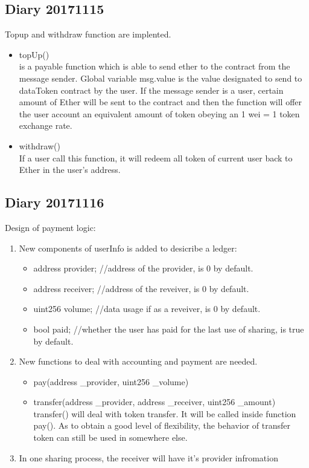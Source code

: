 \subsection{Diary 20171115}
Topup and withdraw function are implented.\\
\begin{itemize}
    \item topUp()\\
    is a payable function which is able to send ether to the contract from the message sender.
    Global variable msg.value is the value designated to send to dataToken contract by the user.
    If the message sender is a user, certain amount of Ether will be sent to the contract and then 
    the function will offer the user account an equivalent amount of token
    obeying an 1 wei = 1 token exchange rate.\\
    \item withdraw()\\
    If a user call this function, 
    it will redeem all token of current user back to Ether in the user's address.
\end{itemize}

\subsection{Diary 20171116}
Design of payment logic:\\
\begin{enumerate}
    \item New components of userInfo is added to desicribe a ledger:
    \begin{itemize}
        \item address provider; //address of the provider, is 0 by default.
        \item address receiver; //address of the reveiver, is 0 by default.
        \item uint256 volume;   //data usage if as a reveiver, is 0 by default.
        \item bool paid;
        //whether the user has paid for the last use of sharing, is true by default.
    \end{itemize}
    \item New functions to deal with accounting and payment are needed.
    \begin{itemize}
        \item pay(address \_provider, uint256 \_volume)
        \item transfer(address \_provider, address \_receiver, uint256 \_amount)\\
        transfer() will deal with token transfer. It will be called inside function pay().
        As to obtain a good level of flexibility,
        the behavior of transfer token can still be used in somewhere else.
    
    \end{itemize}    
    \item In one sharing process, the receiver will have it's provider infromation
\end{enumerate}
